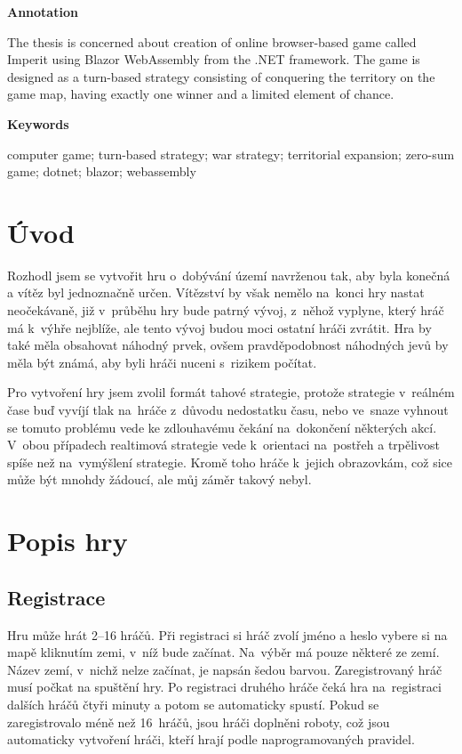 \documentclass[a4paper,12pt]{article}
\begin{document}
\Large\textbf{Annotation}\normalsize

The thesis is concerned about creation of online browser-based game called Imperit using Blazor WebAssembly from the .NET framework. The game is designed as a turn-based strategy consisting of conquering the territory on the game map, having exactly one winner and a limited element of chance.

\Large\textbf{Keywords}\normalsize

computer game; turn-based strategy; war strategy; territorial expansion; zero-sum game;\- dotnet; blazor; webassembly
\newpage
\thispagestyle{empty}
\tableofcontents
\newpage
\section{Úvod}
Rozhodl jsem se vytvořit hru o~dobývání území navrženou tak, aby byla konečná a vítěz byl jednoznačně určen. Vítězství by však nemělo na~konci hry nastat neočekávaně, již v~průběhu hry bude patrný vývoj, z~něhož vyplyne, který hráč má k~výhře nejblíže, ale tento vývoj budou moci ostatní hráči zvrátit. Hra by také měla obsahovat náhodný prvek, ovšem pravděpodobnost náhodných jevů by měla být známá, aby byli hráči nuceni s~rizikem počítat.

Pro vytvoření hry jsem zvolil formát tahové strategie, protože strategie v~reálném čase buď vyvíjí tlak na~hráče z~důvodu nedostatku času, nebo ve~snaze vyhnout se tomuto problému vede ke zdlouhavému čekání na~dokončení některých akcí. \cite{turnreal1} V~obou případech realtimová strategie vede k~orientaci na~postřeh a trpělivost spíše než na~vymýšlení strategie. \cite{turnreal2} Kromě toho  hráče k~jejich obrazovkám, což sice může být mnohdy žádoucí, ale můj záměr takový nebyl.

\section{Popis hry}
\subsection{Registrace}
Hru může hrát 2--16 hráčů. Při registraci si hráč zvolí jméno a heslo vybere si na mapě kliknutím zemi, v~níž bude začínat. Na~výběr má pouze některé ze zemí. Název zemí, v~nichž nelze začínat, je napsán šedou barvou. Zaregistrovaný hráč musí počkat na spuštění hry. Po registraci druhého hráče čeká hra na~registraci dalších hráčů čtyři minuty a potom se automaticky spustí. Pokud se zaregistrovalo méně než 16~hráčů, jsou hráči doplněni roboty, což jsou automaticky vytvoření hráči, kteří hrají podle naprogramovaných pravidel.
\end{document}
